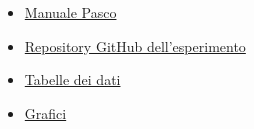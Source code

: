 {\fontsize{12}{14}\selectfont 

\begin{itemize}
    \item \href{https://cdn.pasco.com/product_document/Basic-Current-Balance-Manual-SF-8607.pdf}{Manuale Pasco}
    \item \href{https://github.com/Vayxen/Lab2-E5}{Repository GitHub dell'esperimento}
    \item \href{https://github.com/Vayxen/Lab2-E5/tree/main/tables}{Tabelle dei dati}
    \item \href{https://github.com/Vayxen/Lab2-E5/tree/main/graphs}{Grafici}
\end{itemize}



\par}